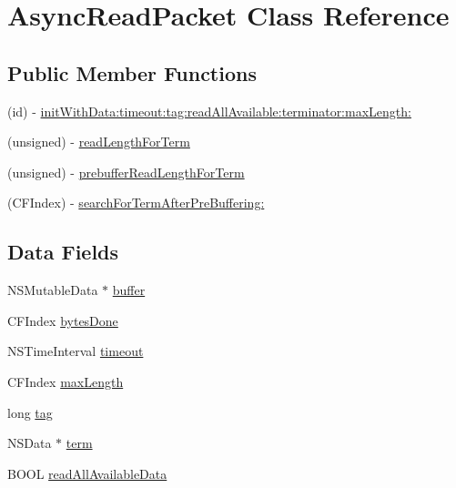 \hypertarget{interface_async_read_packet}{
\section{AsyncReadPacket Class Reference}
\label{interface_async_read_packet}
}
\subsection*{Public Member Functions}
\begin{DoxyCompactItemize}
\item 
(id) -\/ \hyperlink{interface_async_read_packet_a93a1eccd6e5b14afa9187c0e2058e828}{initWithData:timeout:tag:readAllAvailable:terminator:maxLength:}
\item 
(unsigned) -\/ \hyperlink{interface_async_read_packet_abe74c2dae7ffb20a67fdb22489c216b2}{readLengthForTerm}
\item 
(unsigned) -\/ \hyperlink{interface_async_read_packet_ac6b18b826ccef6c8228961772c9ad908}{prebufferReadLengthForTerm}
\item 
(CFIndex) -\/ \hyperlink{interface_async_read_packet_a6db5d6519eb30f831300d459da350c4d}{searchForTermAfterPreBuffering:}
\end{DoxyCompactItemize}
\subsection*{Data Fields}
\begin{DoxyCompactItemize}
\item 
NSMutableData $\ast$ \hyperlink{interface_async_read_packet_a7ab0bf89e1cb8317d120c9c44ab611f0}{buffer}
\item 
CFIndex \hyperlink{interface_async_read_packet_a804028456a90dacc02875cce444fc633}{bytesDone}
\item 
NSTimeInterval \hyperlink{interface_async_read_packet_a39233eb85b4cbae04411577510e7c5e6}{timeout}
\item 
CFIndex \hyperlink{interface_async_read_packet_af40e9808177892b59a4da837758cbd46}{maxLength}
\item 
long \hyperlink{interface_async_read_packet_ae10c29173f0af40507d7e787905c7130}{tag}
\item 
NSData $\ast$ \hyperlink{interface_async_read_packet_ac09dba8aa168ea0ea2797060e554412e}{term}
\item 
BOOL \hyperlink{interface_async_read_packet_aa5c1fe7301afb88f18c0330044951924}{readAllAvailableData}
\end{DoxyCompactItemize}


